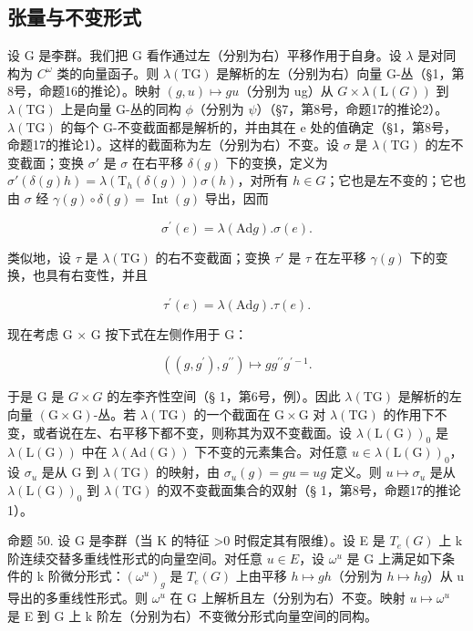 \subsection{张量与不变形式}

设 G 是李群。我们把 G 看作通过左（分别为右）平移作用于自身。设 \(\lambda\) 是对同构为 \(C^{\omega}\) 类的向量函子。则 \(\lambda(\mathrm{TG})\) 是解析的左（分别为右）向量 G-丛（§1，第8号，命题16的推论）。映射 \((g, u) \mapsto gu\)（分别为 ug）从 \(G \times \lambda(\mathrm{L}(G))\) 到 \(\lambda(\mathrm{TG})\) 上是向量 G-丛的同构 \(\phi\)（分别为 \(\psi\)）（§7，第8号，命题17的推论2）。\(\lambda(\mathrm{TG})\) 的每个 G-不变截面都是解析的，并由其在 e 处的值确定（§1，第8号，命题17的推论1）。这样的截面称为左（分别为右）不变。设 \(\sigma\) 是 \(\lambda(\mathrm{TG})\) 的左不变截面；变换 \(\sigma'\) 是 \(\sigma\) 在右平移 \(\delta(g)\) 下的变换，定义为 \(\sigma'(\delta(g)h) = \lambda(\mathrm{T}_{h}(\delta(g)))\sigma(h)\)，对所有 \(h \in G\)；它也是左不变的；它也由 \(\sigma\) 经 \(\gamma(g) \circ \delta(g) = \operatorname{Int}(g)\) 导出，因而

\[
\sigma^ {\prime} (e) = \lambda (\mathrm{Ad} g). \sigma (e).\tag{26}
\]

类似地，设 \(\tau\) 是 \(\lambda(\mathrm{TG})\) 的右不变截面；变换 \(\tau'\) 是 \(\tau\) 在左平移 \(\gamma(g)\) 下的变换，也具有右变性，并且

\[
\tau^ {\prime} (e) = \lambda (\mathrm{Ad} g). \tau (e).\tag{27}
\]

现在考虑 G × G 按下式在左侧作用于 G：

\[
\left(\left(g, g ^ {\prime}\right), g ^ {\prime \prime}\right) \mapsto g g ^ {\prime \prime} g ^ {\prime - 1}.
\]

于是 G 是 \(G \times G\) 的左李齐性空间（§ 1，第6号，例）。因此 \(\lambda(\mathrm{TG})\) 是解析的左向量 \((\mathrm{G} \times \mathrm{G})\)-丛。若 \(\lambda(\mathrm{TG})\) 的一个截面在 \(\mathrm{G} \times \mathrm{G}\) 对 \(\lambda(\mathrm{TG})\) 的作用下不变，或者说在左、右平移下都不变，则称其为双不变截面。设 \(\lambda(\mathrm{L}(\mathrm{G}))_{0}\) 是 \(\lambda(\mathrm{L}(\mathrm{G}))\) 中在 \(\lambda(\mathrm{Ad}(\mathrm{G}))\) 下不变的元素集合。对任意 \(u \in \lambda(\mathrm{L}(\mathrm{G}))_{0}\)，设 \(\sigma_{u}\) 是从 G 到 \(\lambda(\mathrm{TG})\) 的映射，由 \(\sigma_{u}(g) = gu = ug\) 定义。则 \(u \mapsto \sigma_{u}\) 是从 \(\lambda(\mathrm{L}(\mathrm{G}))_{0}\) 到 \(\lambda(\mathrm{TG})\) 的双不变截面集合的双射（§ 1，第8号，命题17的推论1）。

命题 50. 设 G 是李群（当 K 的特征 \textgreater0 时假定其有限维）。设 E 是 \(T_{e}(G)\) 上 k 阶连续交替多重线性形式的向量空间。对任意 \(u \in E\)，设 \(\omega^{u}\) 是 G 上满足如下条件的 k 阶微分形式：\((\omega^{u})_{g}\) 是 \(T_{e}(G)\) 上由平移 \(h \mapsto gh\)（分别为 \(h \mapsto hg\)）从 u 导出的多重线性形式。则 \(\omega^{u}\) 在 G 上解析且左（分别为右）不变。映射 \(u \mapsto \omega^{u}\) 是 E 到 G 上 k 阶左（分别为右）不变微分形式向量空间的同构。


